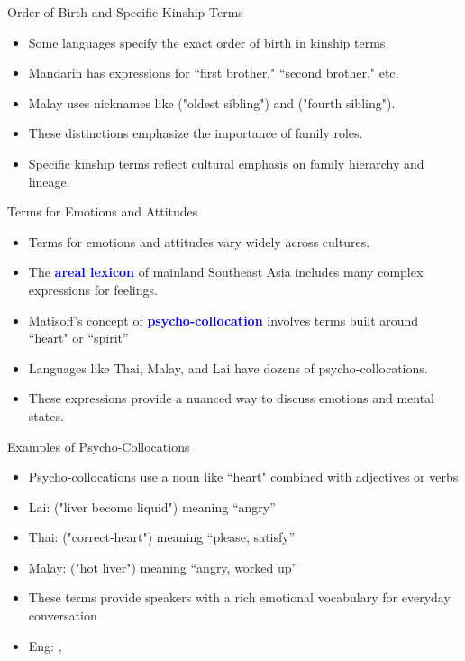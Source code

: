 \documentclass{beamer}
\newcommand{\lao}{\mtciteform}
\newcommand{\tha}{\mtciteform}
\newcommand{\ind}{\mtciteform}
\newcommand{\txx}[1]{\textcolor{blue}{\textbf{#1}}}
\begin{document}
\begin{frame}{Order of Birth and Specific Kinship Terms}
    \begin{itemize}
        \item Some languages specify the exact order of birth in kinship terms.
        \item Mandarin has expressions for ``first brother," ``second brother," etc.
        \item Malay uses nicknames like  ("oldest sibling") and  ("fourth sibling").
        \item These distinctions emphasize the importance of family roles.
        \item Specific kinship terms reflect cultural emphasis on family hierarchy and lineage.
    \end{itemize}
\end{frame}

\begin{frame}{Terms for Emotions and Attitudes}
    \begin{itemize}
        \item Terms for emotions and attitudes vary widely across cultures.
        \item The \txx{areal lexicon} of mainland Southeast Asia includes many complex expressions for feelings.
        \item Matisoff's concept of \txx{psycho-collocation} involves terms built around ``heart" or ``spirit''
        \item Languages like Thai, Malay, and Lai have dozens of psycho-collocations.
        \item These expressions provide a nuanced way to discuss emotions and mental states.
    \end{itemize}
\end{frame}

\begin{frame}{Examples of Psycho-Collocations}
    \begin{itemize}
        \item Psycho-collocations use a noun like ``heart" combined with adjectives or verbs
        \item Lai: \lao{thin haaN} ("liver become liquid") meaning ``angry''
        \item Thai: \tha{thùuk-cay} ("correct-heart") meaning ``please, satisfy''
        \item Malay: \ind{panas hati} ("hot liver") meaning ``angry, worked up''
        \item These terms provide speakers with a rich emotional vocabulary for everyday conversation
        \item Eng: , 
    \end{itemize}
\end{frame}
\end{document}
